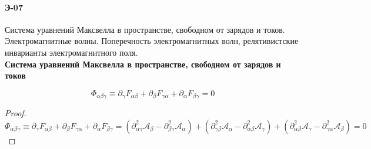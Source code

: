 


 \paragraph{Э-07}
Система уравнений Максвелла в пространстве, свободном от зарядов и токов. Электромагнитные волны. Поперечность электромагнитных волн, релятивистские инварианты электромагнитного поля.\\

\textbf{Система уравнений Максвелла в пространстве, свободном от зарядов и токов}\\
\begin{statement}
$$\Phi_{\alpha\beta\gamma} \equiv \partial_\gamma F_{\alpha\beta} + \partial_\beta F_{\gamma\alpha} + \partial_\alpha F_{\beta\gamma} = 0 $$
\end{statement}
\begin{proof}
$$\Phi_{\alpha\beta\gamma} \equiv \partial_\gamma F_{\alpha\beta} + \partial_\beta F_{\gamma\alpha} + \partial_\alpha F_{\beta\gamma} = (\partial^2_{\alpha\gamma}\mathcal A_\beta - \partial^2_{\beta\gamma}\mathcal A_{\alpha}) + (\partial^2_{\gamma\beta}\mathcal A_\alpha - \partial^2_{\alpha\beta}\mathcal A_{\gamma}) + (\partial^2_{\alpha\beta}\mathcal A_\gamma - \partial^2_{\gamma\alpha}\mathcal A_{\beta}) = 0  $$
\end{proof}

